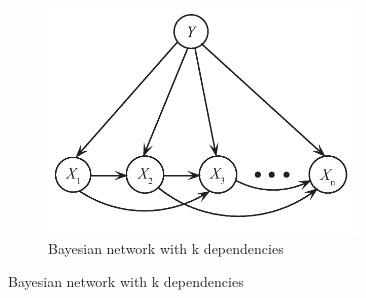 \documentclass[12pt,letterpaper, onecolumn]{exam}
\begin{document}
\begin{questions}
\begin{Solution}
\begin{figure}[!h]
\begin{subfigure}{.5\textwidth}
\end{subfigure}%
\begin{subfigure}{.5\textwidth}
  \centering
  \includegraphics[width=.4\linewidth]{../images/Bayesian}
  \caption{Bayesian network with k dependencies}
\end{subfigure}
\end{figure}
\end{Solution}

\end{questions}
\end{document}
